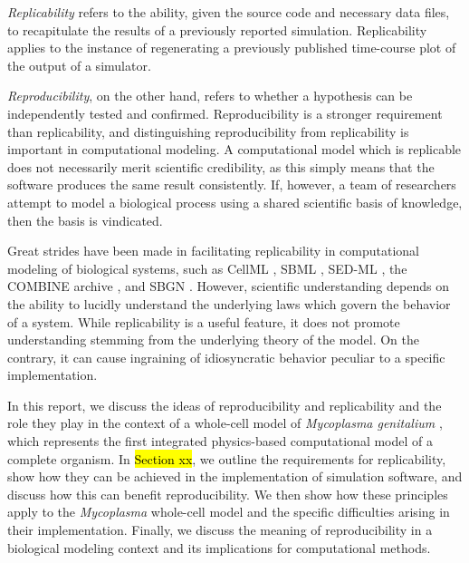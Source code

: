 \documentclass[journal,transmag]{IEEEtran}
\begin{document}
\textit{Replicability} refers to the ability, given the source code and
necessary data files, to recapitulate the results of a previously reported simulation.
Replicability applies to the instance of regenerating a previously published time-course
plot of the output of a simulator.

\textit{Reproducibility}, on the other hand, refers to whether a hypothesis can be
independently tested and confirmed.
Reproducibility is a stronger requirement than replicability, and distinguishing reproducibility
from replicability is important in computational modeling.
A computational model which is replicable does not necessarily merit scientific credibility,
as this simply means that the software produces the same result consistently.
If, however, a team of researchers attempt to model a biological process using
a shared scientific basis of knowledge, then the basis is vindicated.

Great strides have been made in facilitating replicability in computational modeling
of biological systems, such as CellML \cite{cuellar2003overview}, SBML \cite{hucka2003}, SED-ML \cite{sedml2011}, the COMBINE archive \cite{COMBINE2012}, and SBGN \cite{LeNovereHMMSS09}.
However, scientific understanding depends on the ability to lucidly understand the
underlying laws which govern the behavior of a system.
While replicability is a useful feature, it does not promote understanding stemming
from the underlying theory of the model.
On the contrary, it can cause ingraining of idiosyncratic behavior peculiar to a specific
implementation.


In this report, we discuss the ideas of reproducibility and replicability and
the role they play in the context of a whole-cell model of \textit{Mycoplasma genitalium}
\cite{Karr2012},
which represents the first integrated physics-based computational model of a complete organism.
In \hl{Section xx}, we outline the requirements for replicability, show how they can
be achieved in the implementation of simulation software, and discuss how this can benefit
reproducibility. We then show how these principles apply to the \textit{Mycoplasma} whole-cell
model and the specific difficulties arising in their implementation.
Finally, we discuss the meaning of reproducibility in a biological modeling context
and its implications for computational methods.
\end{document}
